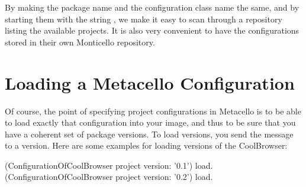 \documentclass[a4paper,10pt,twoside]{book}
\begin{document}
By making the package name and the configuration class name the same, and by starting them with the string ,  we make it easy to scan through a repository listing the available projects. It is also very convenient to have the configurations stored in their own Monticello repository.



\section{Loading a Metacello Configuration}
Of course, the point of specifying project configurations in Metacello is to be able to load exactly that configuration into your image, and thus to be sure that you have a coherent set of package versions.
To load versions, you send the message  to a version. Here are some examples for loading versions of the CoolBrowser:

\begin{code}{}
  (ConfigurationOfCoolBrowser project version: '0.1') load.
  (ConfigurationOfCoolBrowser project version: '0.2') load.
\end{code}
\end{document}
